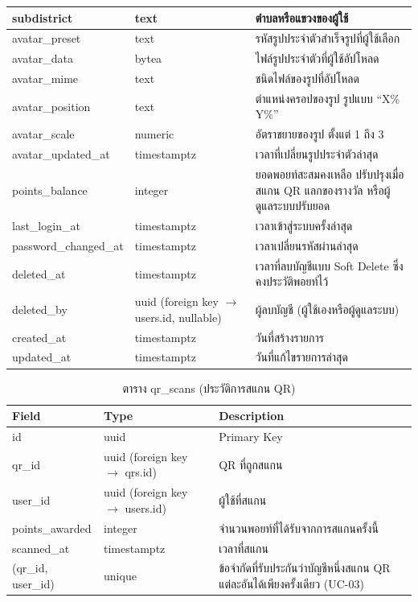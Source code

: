 \begin{longtable}{|p{3.6cm}|p{2.6cm}|p{6.8cm}|}
subdistrict & text & ตำบลหรือแขวงของผู้ใช้ \\ \hline
avatar\_preset & text & รหัสรูปประจำตัวสำเร็จรูปที่ผู้ใช้เลือก \\ \hline
avatar\_data & bytea & ไฟล์รูปประจำตัวที่ผู้ใช้อัปโหลด \\ \hline
avatar\_mime & text & ชนิดไฟล์ของรูปที่อัปโหลด \\ \hline
avatar\_position & text & ตำแหน่งครอปของรูป รูปแบบ ``X\% Y\%'' \\ \hline
avatar\_scale & numeric & อัตราขยายของรูป ตั้งแต่ 1 ถึง 3 \\ \hline
avatar\_updated\_at & timestamptz & เวลาที่เปลี่ยนรูปประจำตัวล่าสุด \\ \hline
points\_balance & integer & ยอดพอยท์สะสมคงเหลือ ปรับปรุงเมื่อสแกน QR แลกของรางวัล หรือผู้ดูแลระบบปรับยอด \\ \hline
last\_login\_at & timestamptz & เวลาเข้าสู่ระบบครั้งล่าสุด \\ \hline
password\_changed\_at & timestamptz & เวลาเปลี่ยนรหัสผ่านล่าสุด \\ \hline
deleted\_at & timestamptz & เวลาที่ลบบัญชีแบบ Soft Delete ซึ่งคงประวัติพอยท์ไว้ \\ \hline
deleted\_by & uuid (foreign key $\to$ users.id, nullable) & ผู้ลบบัญชี (ผู้ใช้เองหรือผู้ดูแลระบบ) \\ \hline
created\_at & timestamptz & วันที่สร้างรายการ \\ \hline
updated\_at & timestamptz & วันที่แก้ไขรายการล่าสุด \\
\hline
\end{longtable}


\begin{table}[H]
\centering
\caption{ตาราง qr\_scans (ประวัติการสแกน QR)}
\label{tab:db_qrscans}
\begin{tabular}{|p{3.6cm}|p{2.6cm}|p{6.8cm}|}
\hline
\textbf{Field} & \textbf{Type} & \textbf{Description} \\
\hline
id & uuid & Primary Key \\ \hline
qr\_id & uuid (foreign key $\to$ qrs.id) & QR ที่ถูกสแกน \\ \hline
user\_id & uuid (foreign key $\to$ users.id) & ผู้ใช้ที่สแกน \\ \hline
points\_awarded & integer & จำนวนพอยท์ที่ได้รับจากการสแกนครั้งนี้ \\ \hline
scanned\_at & timestamptz & เวลาที่สแกน \\ \hline
(qr\_id, user\_id) & unique & ข้อจำกัดที่รับประกันว่าบัญชีหนึ่งสแกน QR แต่ละอันได้เพียงครั้งเดียว (UC-03) \\
\hline
\end{tabular}
\end{table}

